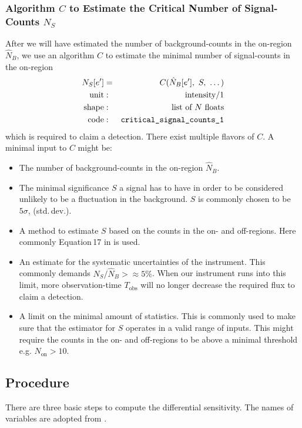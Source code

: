 \documentclass{article}%
\begin{document}
\subsubsection*{Algorithm $C$ to Estimate the Critical Number of Signal-Counts $N_S$}
%
After we will have estimated the number of background-counts in the on-region $\hat{N}_B$, we use an algorithm $C$ to estimate the minimal number of signal-counts in the on-region
%
\begin{eqnarray*}
N_S[e'] &=& C(\hat{N}_B[e'],\,\,S,\,\,\dots)\\
\text{unit} &:& \text{intensity}/1\\
\text{shape} &:& \text{list of}\,\,N\,\,\text{floats}\\
\text{code} &:& \verb|critical_signal_counts_1|
\end{eqnarray*}
%
which is required to claim a detection.
%
There exist multiple flavors of $C$.
%
A minimal input to $C$ might be:
%
\begin{itemize}
%
\item{} The number of background-counts in the on-region $\hat{N}_B$.
%
\item{} The minimal significance $S$ a signal has to have in order to be considered unlikely to be a fluctuation in the background.
%
$S$ is commonly chosen to be $5\sigma$, (std.\,dev.).
%
\item{} A method to estimate $S$ based on the counts in the on- and off-regions. Here commonly Equation\,17 in \cite{li1983analysis} is used.
%
\item{} An estimate for the systematic uncertainties of the instrument. This commonly demands $N_S/\hat{N}_B >\approx 5\%$.
%
When our instrument runs into this limit, more observation-time $T_\text{obs}$ will no longer decrease the required flux to claim a detection.
%
\item{}
A limit on the minimal amount of statistics. This is commonly used to make sure that the estimator for $S$ operates in a valid range of inputs.
%
This might require the counts in the on- and off-regions to be above a minimal threshold e.g. $N_\text{on} > 10$.
%
\end{itemize}
%
\subsection{Procedure}
\label{SubSecProcedure}
%
There are three basic steps to compute the differential sensitivity.
%
The names of variables are adopted from \cite{li1983analysis}.
%
\end{document}
